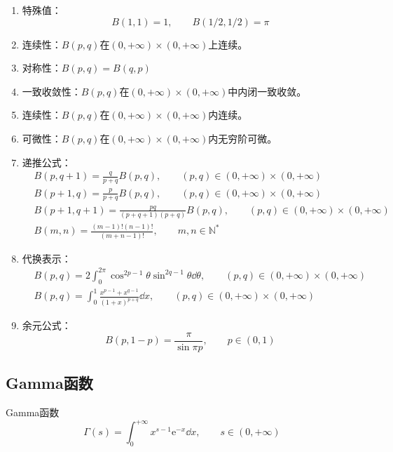 \documentclass[lang = cn, scheme = chinese, thmcnt = section]{elegantbook}
\newcommand{\N}{\mathbb{N}}            %
\newcommand{\ee}[1]{\mathrm{e}^{#1}}
\begin{document}
\begin{theorem}
	\begin{enumerate}
		\item 特殊值：
		$$
		B(1,1)=1,\qquad B(1/2,1/2)=\pi
		$$
		\item 连续性：$B(p,q)$在$(0,+\infty)\times (0,+\infty)$上连续。
		\item 对称性：$B(p,q)=B(q,p)$
		\item 一致收敛性：$B(p,q)$在$(0,+\infty)\times (0,+\infty)$中内闭一致收敛。
		\item 连续性：$B(p,q)$在$(0,+\infty)\times (0,+\infty)$内连续。
		\item 可微性：$B(p,q)$在$(0,+\infty)\times (0,+\infty)$内无穷阶可微。
		\item 递推公式：
		\begin{align*}
			& B(p,q+1)=\frac{q}{p+q}B(p,q),\qquad (p,q)\in (0,+\infty)\times (0,+\infty)\\
			& B(p+1,q)=\frac{p}{p+q}B(p,q),\qquad (p,q)\in (0,+\infty)\times (0,+\infty)\\
			& B(p+1,q+1)=\frac{pq}{(p+q+1)(p+q)}B(p,q),\qquad (p,q)\in (0,+\infty)\times (0,+\infty)\\
			& B(m,n)=\frac{(m-1)!(n-1)!}{(m+n-1)!},\qquad m,n\in\N^*
		\end{align*}
		\item 代换表示：
		\begin{align*}
			& B(p,q)=2\int_{0}^{2\pi}\cos^{2p-1}\theta\sin^{2q-1}\theta\dd \theta,\qquad(p,q)\in (0,+\infty)\times (0,+\infty)\\
			& B(p,q)=\int_{0}^{1}\frac{x^{p-1}+x^{q-1}}{(1+x)^{p+q}}\dd x,\qquad (p,q)\in (0,+\infty)\times (0,+\infty) 
		\end{align*}
		\item 余元公式：
		$$
		B(p,1-p)=\frac{\pi}{\sin \pi p},\qquad p\in (0,1)
		$$
	\end{enumerate}
\end{theorem}

\subsection{Gamma函数}

\begin{definition}{Gamma函数}
	$$
	\Gamma(s)=\int_{0}^{+\infty}x^{s-1}\ee{-x}\dd x,\qquad s\in(0,+\infty)
	$$
\end{definition}
\end{document}
